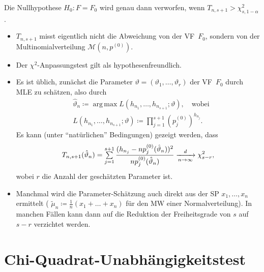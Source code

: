 \documentclass{cheat-sheet}
\DeclareMathOperator*{\argmax}{arg\,max}
\newcommand{\MN}{\mathcal{M}} %
\begin{document}

\begin{entscheidungsregel}
  Die Nullhypothese $H_0 : F = F_0$ wird genau dann verworfen, wenn $T_{n,s+1} > \chi^2_{s,1-\alpha}$.
\end{entscheidungsregel}

\begin{bemn}
  \begin{itemize}
    \item $T_{n,s+1}$ misst eigentlich nicht die Abweichung von der VF~$F_0$, sondern von der Multinomialverteilung $\MN(n, p^{(0)})$.
    \item Der $\chi^2$-Anpassungstest gilt als hypothesenfreundlich.
    \item Es ist üblich, zunächst die Parameter $\vartheta = (\vartheta_1, \ldots, \vartheta_r)$ der VF~$F_0$ durch MLE zu schätzen, also durch
    \begin{align*}
      & \hat{\vartheta}_n \coloneqq \argmax L(h_{n_1}, \ldots, h_{n_{s+1}}; \vartheta), \quad \text{wobei} \\
      & L(h_{n_1}, \ldots, h_{n_{s+1}}; \vartheta) \coloneqq \prod_{j=1}^{s+1} \left( p_j^{(0)} \right)^{h_{n_j}}.
    \end{align*}
    Es kann (unter "`natürlichen"' Bedingungen) gezeigt werden, dass
    \[ T_{n,s+1}(\hat{\vartheta}_n) = \sum_{j=1}^{s+1} \frac{(h_{n_j} - n p_j^{(0)}(\hat{\vartheta}_n))^2}{n p_j^{(0)}(\hat{\vartheta}_n)} \xra[n \to \infty]{d} \chi_{s-r}^2, \]
    wobei $r$ die Anzahl der geschätzten Parameter ist. %
    \item Manchmal wird die Parameter-Schätzung auch direkt aus der SP $x_1, \ldots, x_n$ ermittelt (\zB{} $\tilde{\mu}_n \coloneqq \tfrac{1}{n} (x_1 + \ldots + x_n)$ für den MW einer Normalverteilung).
    In manchen Fällen kann dann auf die Reduktion der Freiheitsgrade von $s$ auf $s-r$ verzichtet werden.
  \end{itemize}
\end{bemn}


\section{Chi-Quadrat-Unabhängigkeitstest}
\end{document}
